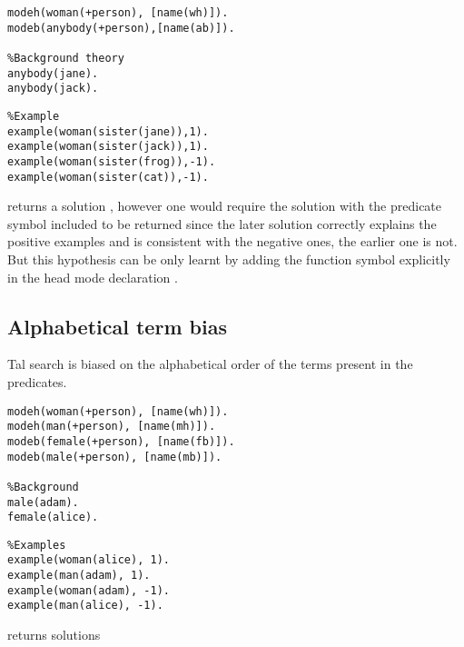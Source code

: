 \begin{minipage}[t]{.50\textwidth}
\begin{lstlisting}
modeh(woman(+person), [name(wh)]).
modeb(anybody(+person),[name(ab)]).

%Background theory
anybody(jane).
anybody(jack).
\end{lstlisting}
\end{minipage}
\begin{minipage}[t]{.20\textwidth}
\begin{lstlisting}
%Example
example(woman(sister(jane)),1).
example(woman(sister(jack)),1).
example(woman(sister(frog)),-1).
example(woman(sister(cat)),-1).
\end{lstlisting}
\end{minipage}

returns a solution , however one would require the solution  with the predicate symbol  included to be returned since the later solution correctly explains the positive examples and is consistent with the negative ones, the earlier one is not. But this hypothesis can be only learnt by adding the function symbol  explicitly in the head mode declaration .

\subsection{Alphabetical term bias}\label{tal_alphabetical_term_bias}
Tal search is biased on the alphabetical order of the terms present in the predicates.

\begin{minipage}[t]{.50\textwidth}
\begin{lstlisting}
modeh(woman(+person), [name(wh)]).
modeh(man(+person), [name(mh)]).
modeb(female(+person), [name(fb)]).
modeb(male(+person), [name(mb)]).

%Background
male(adam).
female(alice).
\end{lstlisting}
\end{minipage}
\begin{minipage}[t]{.20\textwidth}
\begin{lstlisting}
%Examples
example(woman(alice), 1).
example(man(adam), 1).
example(woman(adam), -1).
example(man(alice), -1).
\end{lstlisting}
\end{minipage}

returns solutions

